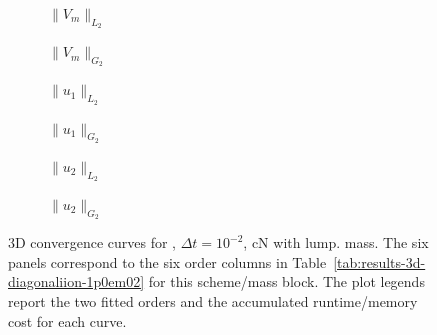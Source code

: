 \begin{figure}[p]
\centering
\begin{subfigure}{0.485\linewidth}
\centering
{}
\caption{$\|V_m\|_{L_2}$}
\label{fig:results-3d-diagonaliion-1p0em02-cranknicolson-lumped-a}
\end{subfigure}
\hfill
\begin{subfigure}{0.485\linewidth}
\centering
{}
\caption{$\|V_m\|_{G_2}$}
\label{fig:results-3d-diagonaliion-1p0em02-cranknicolson-lumped-b}
\end{subfigure}
\par\vspace{0.8em}
\begin{subfigure}{0.485\linewidth}
\centering
{}
\caption{$\|u_1\|_{L_2}$}
\label{fig:results-3d-diagonaliion-1p0em02-cranknicolson-lumped-c}
\end{subfigure}
\hfill
\begin{subfigure}{0.485\linewidth}
\centering
{}
\caption{$\|u_1\|_{G_2}$}
\label{fig:results-3d-diagonaliion-1p0em02-cranknicolson-lumped-d}
\end{subfigure}
\par\vspace{0.8em}
\begin{subfigure}{0.485\linewidth}
\centering
{}
\caption{$\|u_2\|_{L_2}$}
\label{fig:results-3d-diagonaliion-1p0em02-cranknicolson-lumped-e}
\end{subfigure}
\hfill
\begin{subfigure}{0.485\linewidth}
\centering
{}
\caption{$\|u_2\|_{G_2}$}
\label{fig:results-3d-diagonaliion-1p0em02-cranknicolson-lumped-f}
\end{subfigure}
\caption{3D convergence curves for , $\Delta t=10^{-2}$, cN with lump. mass. The six panels correspond to the six order columns in Table~\ref{tab:results-3d-diagonaliion-1p0em02} for this scheme/mass block. The plot legends report the two fitted orders and the accumulated runtime/memory cost for each curve.}
\label{fig:results-3d-diagonaliion-1p0em02-cranknicolson-lumped}
\end{figure}
\FloatBarrier

